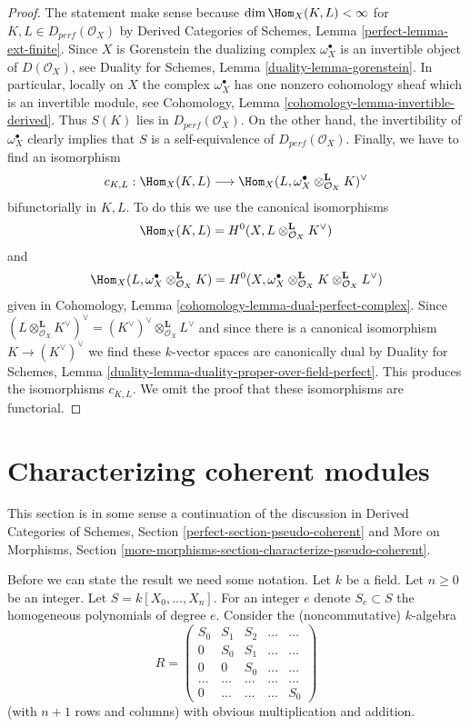 \begin{proof}
The statement make sense because $\dim \Hom_X(K, L) < \infty$
for $K, L \in D_{perf}(\mathcal{O}_X)$ by
Derived Categories of Schemes, Lemma \ref{perfect-lemma-ext-finite}.
Since $X$ is Gorenstein the dualizing complex $\omega_X^\bullet$
is an invertible object of $D(\mathcal{O}_X)$, see
Duality for Schemes, Lemma \ref{duality-lemma-gorenstein}.
In particular, locally on $X$ the complex $\omega_X^\bullet$
has one nonzero cohomology sheaf which is an invertible module, see
Cohomology, Lemma \ref{cohomology-lemma-invertible-derived}.
Thus $S(K)$ lies in $D_{perf}(\mathcal{O}_X)$.
On the other hand, the invertibility of $\omega_X^\bullet$
clearly implies that $S$ is a self-equivalence of $D_{perf}(\mathcal{O}_X)$.
Finally, we have to find an isomorphism
$$
c_{K, L} : \Hom_X(K, L) \longrightarrow
\Hom_X(L, \omega_X^\bullet \otimes_{\mathcal{O}_X}^\mathbf{L} K)^\vee
$$
bifunctorially in $K, L$. To do this we use the canonical isomorphisms
$$
\Hom_X(K, L) = H^0(X, L \otimes_{\mathcal{O}_X}^\mathbf{L} K^\vee)
$$
and
$$
\Hom_X(L, \omega_X^\bullet \otimes_{\mathcal{O}_X}^\mathbf{L} K) =
H^0(X, 
\omega_X^\bullet \otimes_{\mathcal{O}_X}^\mathbf{L} K
\otimes_{\mathcal{O}_X}^\mathbf{L} L^\vee)
$$
given in Cohomology, Lemma \ref{cohomology-lemma-dual-perfect-complex}.
Since $(L \otimes_{\mathcal{O}_X}^\mathbf{L} K^\vee)^\vee =
(K^\vee)^\vee \otimes_{\mathcal{O}_X}^\mathbf{L} L^\vee$
and since there is a canonical isomorphism $K \to (K^\vee)^\vee$
we find these $k$-vector spaces are canonically dual by
Duality for Schemes, Lemma
\ref{duality-lemma-duality-proper-over-field-perfect}.
This produces the isomorphisms $c_{K, L}$.
We omit the proof that these isomorphisms are functorial.
\end{proof}





\section{Characterizing coherent modules}
\label{section-coherent}

\noindent
This section is in some sense a continuation of the discussion
in Derived Categories of Schemes, Section \ref{perfect-section-pseudo-coherent}
and More on Morphisms, Section
\ref{more-morphisms-section-characterize-pseudo-coherent}.

\medskip\noindent
Before we can state the result we need some notation.
Let $k$ be a field. Let $n \geq 0$ be an integer.
Let $S = k[X_0, \ldots, X_n]$. For an integer $e$ denote
$S_e \subset S$ the homogeneous polynomials of degree $e$.
Consider the (noncommutative) $k$-algebra
$$
R =
\left(
\begin{matrix}
S_0 & S_1 & S_2 & \ldots & \ldots \\
0 & S_0 & S_1 & \ldots & \ldots\\
0 & 0 & S_0 & \ldots & \ldots \\
\ldots & \ldots & \ldots & \ldots & \ldots \\
0 & \ldots & \ldots & \ldots & S_0
\end{matrix}
\right)
$$
(with $n + 1$ rows and columns) with obvious multiplication and addition.

